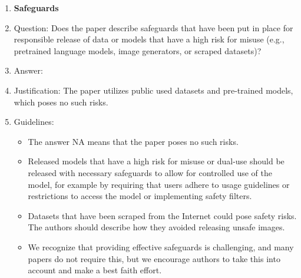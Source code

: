 \documentclass{article}
\begin{document}
\begin{enumerate}
\item {\bf Safeguards}
    \item[] Question: Does the paper describe safeguards that have been put in place for responsible release of data or models that have a high risk for misuse (e.g., pretrained language models, image generators, or scraped datasets)?
    \item[] Answer: \answerNA{} %
    \item[] Justification: The paper utilizes public used datasets and pre-trained models, which poses no such risks.
    \item[] Guidelines:
    \begin{itemize}
        \item The answer NA means that the paper poses no such risks.
        \item Released models that have a high risk for misuse or dual-use should be released with necessary safeguards to allow for controlled use of the model, for example by requiring that users adhere to usage guidelines or restrictions to access the model or implementing safety filters. 
        \item Datasets that have been scraped from the Internet could pose safety risks. The authors should describe how they avoided releasing unsafe images.
        \item We recognize that providing effective safeguards is challenging, and many papers do not require this, but we encourage authors to take this into account and make a best faith effort.
    \end{itemize}


\end{enumerate}
\end{document}
